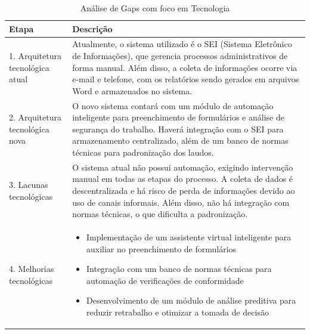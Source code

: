 \documentclass[12pt,a4paper]{article}
\begin{document}
\begin{table}[htbp]
\centering
\begin{tcolorbox}[enhanced, colback=white, colframe=gray!40, arc=3mm, boxrule=0.5pt, width=0.85\linewidth]
\begin{tabular}{|p{2cm}|p{10cm}|}
\hline
\rowcolor{gray!20}
\textbf{Etapa} & \textbf{Descrição} \\
\hline
1. Arquitetura tecnológica atual & Atualmente, o sistema utilizado é o SEI (Sistema Eletrônico de Informações), que gerencia processos administrativos de forma manual. Além disso, a coleta de informações ocorre via e-mail e telefone, com os relatórios sendo gerados em arquivos Word e armazenados no sistema. \\
\hline
2. Arquitetura tecnológica nova & O novo sistema contará com um módulo de automação inteligente para preenchimento de formulários e análise de segurança do trabalho. Haverá integração com o SEI para armazenamento centralizado, além de um banco de normas técnicas para padronização dos laudos. \\
\hline
3. Lacunas tecnológicas & O sistema atual não possui automação, exigindo intervenção manual em todas as etapas do processo. A coleta de dados é descentralizada e há risco de perda de informações devido ao uso de canais informais. Além disso, não há integração com normas técnicas, o que dificulta a padronização. \\
\hline
4. Melhorias tecnológicas & \begin{itemize}\setlength{\itemsep}{0pt}
\item Implementação de um assistente virtual inteligente para auxiliar no preenchimento de formulários
\item Integração com um banco de normas técnicas para automação de verificações de conformidade
\item Desenvolvimento de um módulo de análise preditiva para reduzir retrabalho e otimizar a tomada de decisão
\end{itemize} \\
\hline
\end{tabular}
\end{tcolorbox}
\caption{Análise de Gaps com foco em Tecnologia}
\end{table}
\end{document}

